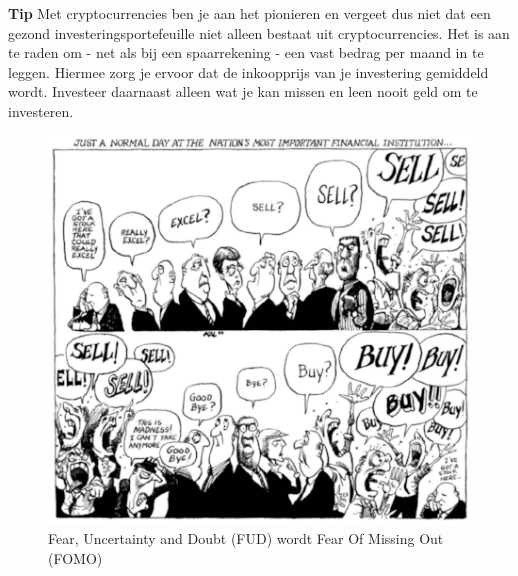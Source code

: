     \begin{tipbox}{\textbf{Tip}}
    Met cryptocurrencies ben je aan het pionieren en vergeet dus niet dat een gezond investeringsportefeuille niet alleen bestaat uit cryptocurrencies. Het is aan te raden om - net als bij een spaarrekening - een vast bedrag per maand in te leggen. Hiermee zorg je ervoor dat de inkoopprijs van je investering gemiddeld wordt. Investeer daarnaast alleen wat je kan missen en leen nooit geld om te investeren.
    \end{tipbox}\medskip

    \begin{figure}
    \centering
    \includegraphics[width=.6\textwidth]{img/ch-investing/FOMOFUD.png}
    \caption{Fear, Uncertainty and Doubt (FUD) wordt Fear Of Missing Out (FOMO)}
    \label{fig:FOMOFUD}
    \end{figure}
    

    